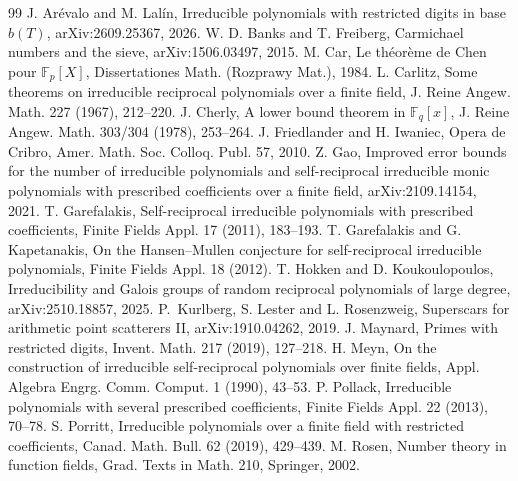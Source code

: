 \documentclass[11pt]{amsart}
\theoremstyle{definition}
\newcommand{\F}{\mathbb{F}}
\begin{document}
\begin{thebibliography}{99}
 J. Ar\'evalo and M. Lal\'in, Irreducible polynomials with restricted digits in base $b(T)$, arXiv:2609.25367, 2026.
 W. D. Banks and T. Freiberg, Carmichael numbers and the sieve, arXiv:1506.03497, 2015.
 M. Car, Le th\'eor\`eme de Chen pour $\F_p[X]$, Dissertationes Math. (Rozprawy Mat.), 1984.
 L. Carlitz, Some theorems on irreducible reciprocal polynomials over a finite field, J. Reine Angew. Math. 227 (1967), 212--220.
 J. Cherly, A lower bound theorem in $\F_q[x]$, J. Reine Angew. Math. 303/304 (1978), 253--264.
 J. Friedlander and H. Iwaniec, Opera de Cribro, Amer. Math. Soc. Colloq. Publ. 57, 2010.
 Z. Gao, Improved error bounds for the number of irreducible polynomials and self-reciprocal irreducible monic polynomials with prescribed coefficients over a finite field, arXiv:2109.14154, 2021.
 T. Garefalakis, Self-reciprocal irreducible polynomials with prescribed coefficients, Finite Fields Appl. 17 (2011), 183--193.
 T. Garefalakis and G. Kapetanakis, On the Hansen--Mullen conjecture for self-reciprocal irreducible polynomials, Finite Fields Appl. 18 (2012).
 T. Hokken and D. Koukoulopoulos, Irreducibility and Galois groups of random reciprocal polynomials of large degree, arXiv:2510.18857, 2025.
 P.~Kurlberg, S. Lester and L. Rosenzweig, Superscars for arithmetic point scatterers II, arXiv:1910.04262, 2019.
 J. Maynard, Primes with restricted digits, Invent. Math. 217 (2019), 127--218.
 H. Meyn, On the construction of irreducible self-reciprocal polynomials over finite fields, Appl. Algebra Engrg. Comm. Comput. 1 (1990), 43--53.
 P. Pollack, Irreducible polynomials with several prescribed coefficients, Finite Fields Appl. 22 (2013), 70--78.
 S. Porritt, Irreducible polynomials over a finite field with restricted coefficients, Canad. Math. Bull. 62 (2019), 429--439.
 M. Rosen, Number theory in function fields, Grad. Texts in Math. 210, Springer, 2002.
\end{thebibliography}
\end{document}
